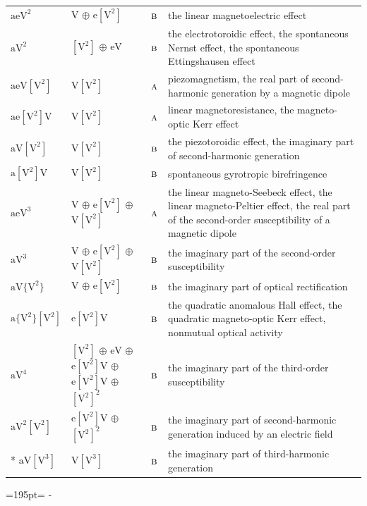 \documentclass[10pt,a4paper]{article}
\newcommand{\needspace}[1]{\par\penalty-100\begingroup\dimen0=#1\relax\dimen2=\pagegoal
  \advance\dimen2-\pagetotal\ifdim\dimen0>\dimen2\relax\ifdim\dimen2>0pt\vfil\break\fi\fi
  \endgroup}
\numberwithin{equation}{section}
\newcommand{\irr}[1]{\text{\normalfont\scshape #1}}
\newcommand{\jahn}[1]{\mathrm{#1}}
\newlength{\fillwidth}\newlength{\cellwidth}\newlength{\colwidth}
\begin{document}
{\begin{longtable}{@{}lll>{\RaggedRight\arraybackslash}p{\fillwidth}@{}}
$\jahn{aeV^{2}}$ & $\jahn{V}$ $\oplus$ $\jahn{e[V^{2}]}$ & $\irr{b}$ & the linear magnetoelectric effect\\
$\jahn{aV^{2}}$ & $\jahn{[V^{2}]}$ $\oplus$ $\jahn{eV}$ & $\irr{b}$ & the electrotoroidic effect, the spontaneous Nernst effect, the spontaneous Ettingshausen effect\\
$\jahn{aeV[V^{2}]}$ & $\jahn{V[V^{2}]}$ & $\irr{a}$ & piezomagnetism, the real part of second-harmonic generation by a magnetic dipole\\
$\jahn{ae[V^{2}]V}$ & $\jahn{V[V^{2}]}$ & $\irr{a}$ & linear magnetoresistance, the magneto-optic Kerr effect\\
$\jahn{aV[V^{2}]}$ & $\jahn{V[V^{2}]}$ & $\irr{b}$ & the piezotoroidic effect, the imaginary part of second-harmonic generation\\
$\jahn{a[V^{2}]V}$ & $\jahn{V[V^{2}]}$ & $\irr{b}$ & spontaneous gyrotropic birefringence\\
$\jahn{aeV^{3}}$ & $\jahn{V}$ $\oplus$ $\jahn{e[V^{2}]}$ $\oplus$ $\jahn{V[V^{2}]}$ & $\irr{a}$ & the linear magneto-Seebeck effect, the linear magneto-Peltier effect, the real part of the second-order susceptibility of a magnetic dipole\\
$\jahn{aV^{3}}$ & $\jahn{V}$ $\oplus$ $\jahn{e[V^{2}]}$ $\oplus$ $\jahn{V[V^{2}]}$ & $\irr{b}$ & the imaginary part of the second-order susceptibility\\
$\jahn{aV\{V^{2}\}}$ & $\jahn{V}$ $\oplus$ $\jahn{e[V^{2}]}$ & $\irr{b}$ & the imaginary part of optical rectification\\
$\jahn{a\{V^{2}\}[V^{2}]}$ & $\jahn{e[V^{2}]V}$ & $\irr{b}$ & the quadratic anomalous Hall effect, the quadratic magneto-optic Kerr effect, nonmutual optical activity\\
$\jahn{aV^{4}}$ & $\jahn{[V^{2}]}$ $\oplus$ $\jahn{eV}$ $\oplus$ $\jahn{e[V^{2}]V}$ $\oplus$ $\jahn{e[V^{2}]V}$ $\oplus$ $\jahn{[V^{2}]^{2}}$ & $\irr{b}$ & the imaginary part of the third-order susceptibility\\
$\jahn{aV^{2}[V^{2}]}$ & $\jahn{e[V^{2}]V}$ $\oplus$ $\jahn{[V^{2}]^{2}}$ & $\irr{b}$ & the imaginary part of second-harmonic generation induced by an electric field\\*
$\jahn{aV[V^{3}]}$ & $\jahn{V[V^{3}]}$ & $\irr{b}$ & the imaginary part of third-harmonic generation\\
\bottomrule\end{longtable}}
\needspace{195pt}
\end{document}

